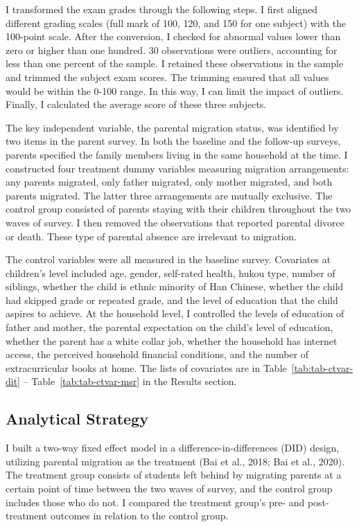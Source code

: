 \documentclass[
  man,floatsintext]{apa7}
\begin{document}
I transformed the exam grades through the following steps. I first aligned different grading scales (full mark of 100, 120, and 150 for one subject) with the 100-point scale. After the conversion, I checked for abnormal values lower than zero or higher than one hundred. 30 observations were outliers, accounting for less than one percent of the sample. I retained these observations in the sample and trimmed the subject exam scores. The trimming ensured that all values would be within the 0-100 range. In this way, I can limit the impact of outliers. Finally, I calculated the average score of these three subjects.

The key independent variable, the parental migration status, was identified by two items in the parent survey. In both the baseline and the follow-up surveys, parents specified the family members living in the same household at the time. I constructed four treatment dummy variables measuring migration arrangements: any parents migrated, only father migrated, only mother migrated, and both parents migrated. The latter three arrangements are mutually exclusive. The control group consisted of parents staying with their children throughout the two waves of survey. I then removed the observations that reported parental divorce or death. These type of parental absence are irrelevant to migration.

The control variables were all measured in the baseline survey. Covariates at children's level included age, gender, self-rated health, hukou type, number of siblings, whether the child is ethnic minority of Han Chinese, whether the child had skipped grade or repeated grade, and the level of education that the child aspires to achieve. At the household level, I controlled the levels of education of father and mother, the parental expectation on the child's level of education, whether the parent has a white collar job, whether the household has internet access, the perceived household financial conditions, and the number of extracurricular books at home. The lists of covariates are in Table~\ref{tab:tab-ctvar-dit} -- Table~\ref{tab:tab-ctvar-msr} in the Results section.

\hypertarget{analytical-strategy}{%
\subsection{Analytical Strategy}\label{analytical-strategy}}

I built a two-way fixed effect model in a difference-in-differences (DID) design, utilizing parental migration as the treatment (Bai et al., 2018; Bai et al., 2020). The treatment group consists of students left behind by migrating parents at a certain point of time between the two waves of survey, and the control group includes those who do not. I compared the treatment group's pre- and post-treatment outcomes in relation to the control group.
\end{document}
